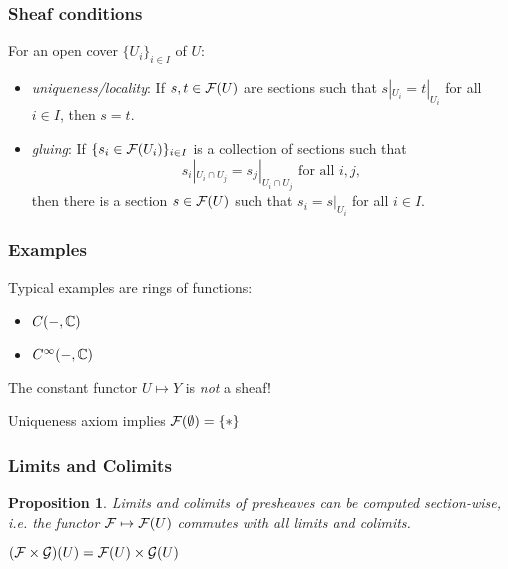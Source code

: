 \documentclass{beamer}
\newtheorem{proposition}{Proposition}
\begin{document}
\begin{frame}
    \frametitle{Sheaf conditions}

    For an open cover $\{U_i\}_{i\in I}$ of $U$:
    \begin{itemize}
        \item \emph{uniqueness/locality}: If $s,t\in \mathcal{F}(U)$ are sections such that
              $s|_{U_i} = t|_{U_i}$ for all $i\in I$, then $s=t$.
              \pause
        \item \emph{gluing}: If $\{s_i \in \mathcal{F}(U_i)\}_{i\in I}$ is
              a collection of sections such that
              \begin{equation*}
                  s_i|_{U_i \cap U_j} = s_j|_{U_i \cap U_j} \text { for all } i, j,
              \end{equation*}
              then there is a section $s\in \mathcal{F}(U)$ such that $s_i = s|_{U_i}$ for all $i \in I$.
    \end{itemize}

\end{frame}
\begin{frame}
    \frametitle{Examples}

    Typical examples are rings of functions:
    \begin{itemize}
        \item $C(-, \mathbb{C})$
        \item $C^\infty(-, \mathbb{C})$
    \end{itemize}
    \pause
    \medskip

    \medskip
    The constant functor $U \mapsto Y$ is \emph{not} a sheaf!

    Uniqueness axiom implies $\mathcal{F}(\emptyset) = \{*\}$
\end{frame}

\begin{frame}
    \frametitle{Limits and Colimits}

    \begin{proposition}
        Limits and colimits of presheaves can be computed
        section-wise, i.e. the functor $\mathcal{F} \mapsto \mathcal{F}(U)$
        commutes with all limits and colimits.
    \end{proposition}

    \pause
    \begin{example}
        $(\mathcal{F}\times \mathcal{G} )(U) = \mathcal{F}(U) \times \mathcal{G}(U)$
    \end{example}

\end{frame}
\end{document}
